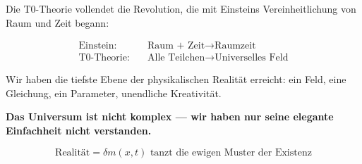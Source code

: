 \documentclass[12pt,a4paper]{article}
\newcommand{\deltam}{\delta m}
\begin{document}
	Die T0-Theorie vollendet die Revolution, die mit Einsteins Vereinheitlichung von Raum und Zeit begann:
	
	\begin{align}
		\text{Einstein:} \quad &\text{Raum + Zeit} \rightarrow \text{Raumzeit} \\
		\text{T0-Theorie:} \quad &\text{Alle Teilchen} \rightarrow \text{Universelles Feld}
	\end{align}
	
	Wir haben die tiefste Ebene der physikalischen Realität erreicht: ein Feld, eine Gleichung, ein Parameter, unendliche Kreativität.
	
	\textbf{Das Universum ist nicht komplex --- wir haben nur seine elegante Einfachheit nicht verstanden.}
	
	\begin{equation}
		\boxed{\text{Realität} = \deltam(x,t) \text{ tanzt die ewigen Muster der Existenz}}
		\label{eq:final_truth}
	\end{equation}
	
\end{document}
